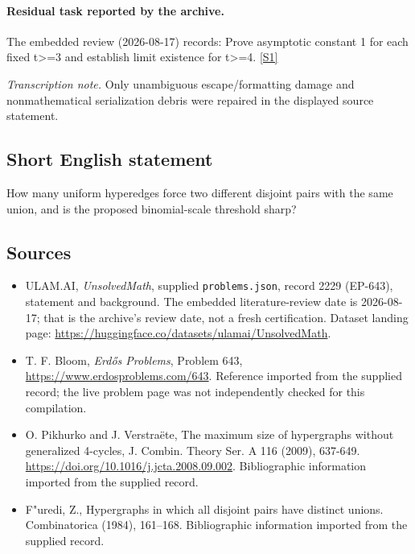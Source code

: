 \documentclass[11pt,a4paper]{article}
\newcommand{\sref}[2]{\hyperlink{source:#1:#2}{[S#2]}}
\begin{document}
\paragraph{Residual task reported by the archive.}

The embedded review (2026-08-17) records: Prove asymptotic constant 1 for each fixed t>=3 and establish limit existence for t>=4. \sref{2229}{1}

{\small\emph{Transcription note.} Only unambiguous escape/formatting damage and nonmathematical serialization debris were repaired in the displayed source statement.}

\subsection{Short English statement}

How many uniform hyperedges force two different disjoint pairs with the same union, and is the proposed binomial-scale threshold sharp?

\subsection{Sources}

{\small

\begin{itemize}

\item[\hypertarget{source:2229:1}{S1}] ULAM.AI, \emph{UnsolvedMath}, supplied \texttt{problems.json}, record 2229 (EP-643), statement and background. The embedded literature-review date is 2026-08-17; that is the archive’s review date, not a fresh certification. Dataset landing page: \url{https://huggingface.co/datasets/ulamai/UnsolvedMath}.

\item[\hypertarget{source:2229:2}{S2}] T. F. Bloom, \emph{Erdős Problems}, Problem 643, \url{https://www.erdosproblems.com/643}. Reference imported from the supplied record; the live problem page was not independently checked for this compilation.

\item[\hypertarget{source:2229:3}{S3}] O. Pikhurko and J. Verstraëte, The maximum size of hypergraphs without generalized 4-cycles, J. Combin. Theory Ser. A 116 (2009), 637-649. \url{https://doi.org/10.1016/j.jcta.2008.09.002}. Bibliographic information imported from the supplied record.

\item[\hypertarget{source:2229:4}{S4}] F"uredi, Z., Hypergraphs in which all disjoint pairs have distinct unions. Combinatorica (1984), 161--168. Bibliographic information imported from the supplied record.

\end{itemize}

}

\label{end:2229}
\end{document}
